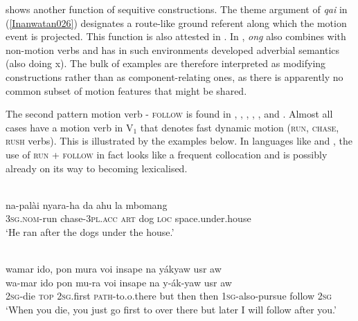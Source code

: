  shows another function of sequitive constructions. The theme argument of \textit{qai} in (\ref{Inanwatan026}) designates a route-like ground referent along which the motion event is projected. This function is also attested in . In , \textit{ong} also combines with non-motion verbs and has in such environments developed adverbial semantics (also doing x). The bulk of  examples are therefore interpreted as modifying constructions rather than as component-relating ones, as there is apparently no common subset of motion features that might be shared.

The second pattern motion verb - \textsc{follow} is found in , , , , , and . Almost all cases have a motion verb in V$_{1}$ that denotes fast dynamic motion (\textsc{run}, \textsc{chase}, \textsc{rush} verbs). This is illustrated by the examples below. In languages like  and , the use of \textsc{run} + \textsc{follow} in fact looks like a frequent collocation and is possibly already on its way to becoming lexicalised.

\ea \label{Kambera003}
\\
\gll na-palài nyara-ha da ahu la mbomang \\
\textsc{3}\textsc{sg}.\textsc{nom}-run chase-\textsc{3}\textsc{pl}.\textsc{acc} \textsc{art} dog \textsc{loc} space.under.house \\
\glft `He ran after the dogs under the house.' \\ 
\z

\ea \label{Biak005}
\\
\glll wamar ido, pon mura voi insape na yákyaw usr aw \\
wa-mar ido pon mu-ra voi insape na y-ák-yaw usr aw \\
\textsc{2}\textsc{sg}-die \textsc{top} \textsc{2}\textsc{sg}.first \textsc{path}-to.o.there but then then \textsc{1}\textsc{sg}-also-pursue follow \textsc{2}\textsc{sg} \\
\glft `When you die, you just go first to over there but later I will follow after you.'\\ 
\z

